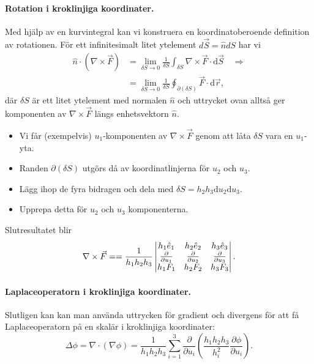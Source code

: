 \documentclass[%
oneside,                 %
final,                   %
10pt]{article}
\begin{document}
\paragraph{Rotation i kroklinjiga koordinater.}
Med hjälp av en kurvintegral kan vi konstruera en koordinatoberoende definition av rotationen. För ett infinitesimalt litet ytelement $d\vec{S} = \hat{n} dS$ har vi
\begin{align}
  \hat{n} \cdot \left( \nabla \times \vec{F} \right) &=  \lim_{\delta S \to 0} \frac{1}{\delta S} \int_{\delta S} \nabla \times \vec{F} \cdot \mbox{d} \vec{S} \quad \Rightarrow \nonumber \\
  &= \lim_{\delta S \to 0} 
\frac{1}{\delta S} \oint_{\partial (\delta S)} \vec{F} \cdot \mbox{d}\vec{r},
\end{align}
där $\delta S$ är ett litet ytelement med normalen $\hat{n}$ och uttrycket ovan alltså ger komponenten av $\nabla \times \vec{F}$ längs enhetsvektorn $\hat{n}$.
\begin{itemize}
\item Vi får (exempelvis) $u_1$-komponenten av $\nabla \times \vec{F}$ genom att låta $\delta S$ vara en $u_1$-yta.

\item Randen $\partial(\delta S)$ utgörs då av koordinatlinjerna för $u_2$ och $u_3$.

\item Lägg ihop de fyra bidragen och dela med $\delta S = h_2 h_3 \mbox{d}u_2 \mbox{d}u_3$.

\item Upprepa detta för $u_2$ och $u_3$ komponenterna.
\end{itemize}

\noindent
Slutresultatet blir
\begin{equation}
\nabla \times \vec{F} = = \frac{1}{h_1 h_2 h_3} \left|
\begin{matrix}
h_1 \hat{e}_1 & h_2\hat{e}_2 & h_3\hat{e}_3\cr
\frac{\partial }{\partial u_1} & \frac{\partial }{\partial u_2} & \frac{\partial }{\partial u_3}\cr
h_1F_1 & h_2F_2 & h_3F_3 \cr
\end{matrix} \right| .
\end{equation}

\paragraph{Laplaceoperatorn i kroklinjiga koordinater.}
Slutligen kan kan man använda uttrycken för gradient och divergens för att få  Laplaceoperatorn på en skalär i kroklinjiga koordinater:
\begin{equation}
\Delta\phi=\nabla \cdot (\nabla\phi)
=\frac{1}{h_1h_2h_3}\sum_{i=1}^3
\frac{\partial}{\partial u_i} \left( \frac{h_1h_2h_3}{h_i^2} \frac{\partial\phi}{\partial u_i} \right).
\end{equation}
\end{document}
